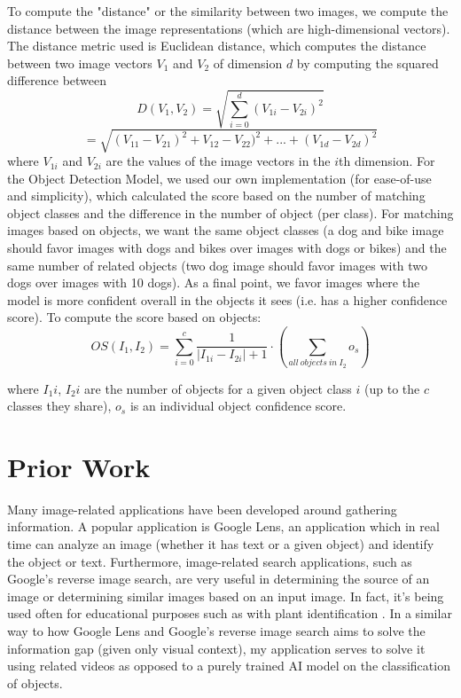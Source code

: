 \documentclass[10pt,twocolumn]{article}
\begin{document}
To compute the "distance" or the similarity between two images, we compute the distance between the image representations (which are high-dimensional vectors). The distance metric used is Euclidean distance, which computes the distance between two image vectors $V_1$ and $V_2$ of dimension $d$ by computing the squared difference between  $$D(V_1, V_2) = \sqrt{\sum_{i=0}^{d} (V_{1i} - V_{2i})^2}$$
$$ = \sqrt{(V_{11} - V_{21})^2 + V_{12} - V_{22})^2 + ... + (V_{1d} - V_{2d})^2 }$$ where $V_{1i}$ and $V_{2i}$ are the values of the image vectors in the $i$th dimension. For the Object Detection Model, we used our own implementation (for ease-of-use and simplicity), which calculated the score based on the number of matching object classes and the difference in the number of object (per class). For matching images based on objects, we want the same object classes (a dog and bike image should favor images with dogs and bikes over images with dogs or bikes) and the same number of related objects (two dog image should favor images with two dogs over images with 10 dogs). As a final point, we favor images where the model is more confident overall in the objects it sees (i.e. has a higher confidence score). To compute the score based on objects: $$OS(I_1, I_2) = \sum_{i = 0}^{c} \frac{1}{|I_{1i} - I_{2i}| + 1} \cdot (\sum_{all \ objects \ in \ I_{2}} o_s)$$

where $I_1i$, $I_2i$ are the number of objects for a given object class $i$ (up to the $c$ classes they share), $o_s$ is an individual object confidence score.

\section{Prior Work}

Many image-related applications have been developed around gathering information. A popular application is Google Lens, an application which in real time can analyze an image (whether it has text or a given object) and identify the object or text. Furthermore, image-related search applications, such as Google’s reverse image search, are very useful in determining the source of an image or determining similar images based on an input image. In fact, it’s being used often for educational purposes such as with plant identification \cite{Moore2018}. In a similar way to how Google Lens and Google’s reverse image search aims to solve the information gap (given only visual context), my application serves to solve it using related videos as opposed to a purely trained AI model on the classification of objects.
\end{document}
